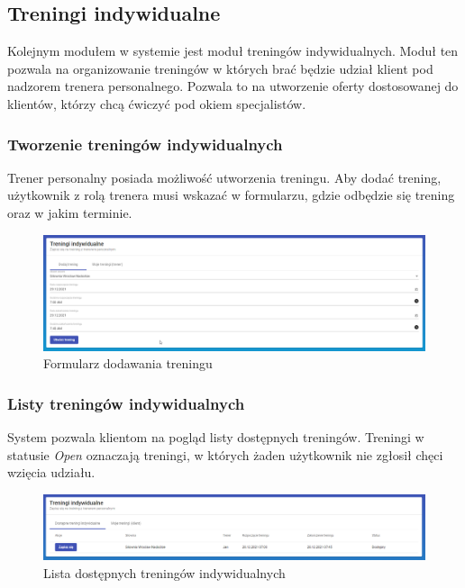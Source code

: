 \documentclass[a4paper,twoside,12pt]{book}
\begin{document}
\subsection{Treningi indywidualne}
Kolejnym modułem w systemie jest moduł treningów indywidualnych. Moduł ten pozwala na organizowanie treningów w których brać będzie udział klient pod nadzorem trenera personalnego. Pozwala to na utworzenie oferty dostosowanej do klientów, którzy chcą ćwiczyć pod okiem specjalistów.

\subsubsection{Tworzenie treningów indywidualnych}
Trener personalny posiada możliwość utworzenia treningu. Aby dodać trening, użytkownik z rolą trenera musi wskazać w formularzu, gdzie odbędzie się trening oraz w jakim terminie.
\begin{figure}[H]
	\centering
	\includegraphics[width=1\linewidth]{../zrzuty_ekranu/dzialanie/treningi/dodawanie_treningu}
	\caption{Formularz dodawania treningu}
	\label{fig:dodawanietreningu}
\end{figure}

\subsubsection{Listy treningów indywidualnych}
System pozwala klientom na pogląd listy dostępnych treningów. Treningi w statusie \textit{Open} oznaczają treningi, w których żaden użytkownik nie zgłosił chęci wzięcia udziału.
\begin{figure}[H]
	\centering
	\includegraphics[width=1\linewidth]{../zrzuty_ekranu/dzialanie/treningi/klient_dostepne_treningi}
	\caption{Lista dostępnych treningów indywidualnych}
	\label{fig:klientdostepnetreningi}
\end{figure}
\end{document}
